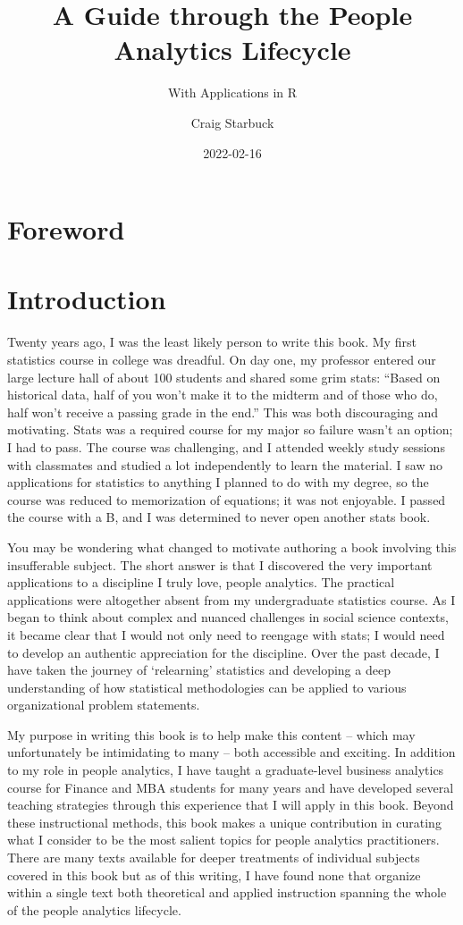 \documentclass[]{book}
\title{A Guide through the People Analytics Lifecycle}
\subtitle{With Applications in R}
\author{Craig Starbuck}
\date{2022-02-16}
\begin{document}
\maketitle

{
\setcounter{tocdepth}{1}
\tableofcontents
}
\hypertarget{foreword}{%
\chapter{Foreword}\label{foreword}}

\hypertarget{intro}{%
\chapter{Introduction}\label{intro}}

Twenty years ago, I was the least likely person to write this book. My first statistics course in college was dreadful. On day one, my professor entered our large lecture hall of about 100 students and shared some grim stats: ``Based on historical data, half of you won't make it to the midterm and of those who do, half won't receive a passing grade in the end.'' This was both discouraging and motivating. Stats was a required course for my major so failure wasn't an option; I had to pass. The course was challenging, and I attended weekly study sessions with classmates and studied a lot independently to learn the material. I saw no applications for statistics to anything I planned to do with my degree, so the course was reduced to memorization of equations; it was not enjoyable. I passed the course with a B, and I was determined to never open another stats book.

You may be wondering what changed to motivate authoring a book involving this insufferable subject. The short answer is that I discovered the very important applications to a discipline I truly love, people analytics. The practical applications were altogether absent from my undergraduate statistics course. As I began to think about complex and nuanced challenges in social science contexts, it became clear that I would not only need to reengage with stats; I would need to develop an authentic appreciation for the discipline. Over the past decade, I have taken the journey of `relearning' statistics and developing a deep understanding of how statistical methodologies can be applied to various organizational problem statements.

My purpose in writing this book is to help make this content -- which may unfortunately be intimidating to many -- both accessible and exciting. In addition to my role in people analytics, I have taught a graduate-level business analytics course for Finance and MBA students for many years and have developed several teaching strategies through this experience that I will apply in this book. Beyond these instructional methods, this book makes a unique contribution in curating what I consider to be the most salient topics for people analytics practitioners. There are many texts available for deeper treatments of individual subjects covered in this book but as of this writing, I have found none that organize within a single text both theoretical and applied instruction spanning the whole of the people analytics lifecycle.
\end{document}
